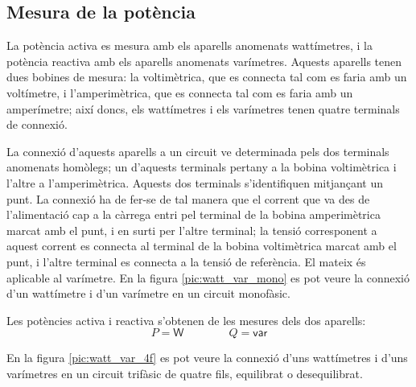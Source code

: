 \subsection{Mesura de la potència}

La potència activa es mesura amb els aparells anomenats wattímetres,
i la potència reactiva amb els aparells anomenats varímetres.
Aquests aparells tenen dues bobines de mesura: la voltimètrica,
que es connecta tal com es faria amb un voltímetre, i
l'amperimètrica, que es connecta tal com es faria amb un
amperímetre; així doncs, els wattímetres i els varímetres tenen
quatre terminals de connexió.

La connexió d'aquests aparells a un circuit ve determinada pels dos terminals
anomenats homòlegs; un d'aquests terminals pertany a la bobina
voltimètrica i l'altre a l'amperimètrica. Aquests dos terminals s'identifiquen mitjançant un punt. La connexió
ha de fer-se de tal manera que el corrent que va des de
l'alimentació cap a la càrrega entri  pel  terminal de
la bobina amperimètrica marcat amb el punt, i en surti per l'altre terminal; la tensió corresponent
a aquest corrent es connecta al terminal de la bobina voltimètrica marcat amb el punt, i l'altre terminal es connecta a la tensió de referència. El mateix és aplicable al varímetre. En la figura \vref{pic:watt_var_mono} es pot veure la connexió d'un wattímetre i d'un varímetre en un circuit monofàsic.


\begin{center}
    
    \label{pic:watt_var_mono}
\end{center}

Les potències activa i reactiva s'obtenen de les mesures dels dos
aparells:
\begin{equation}
    P = \textsf{W} \qquad\qquad Q = \textsf{var}
\end{equation}

En la figura \vref{pic:watt_var_4f} es pot veure la connexió d'uns
wattímetres i d'uns varímetres en un circuit trifàsic de quatre fils,
equilibrat o desequilibrat.

\begin{center}
    
    \label{pic:watt_var_4f}
\end{center}

